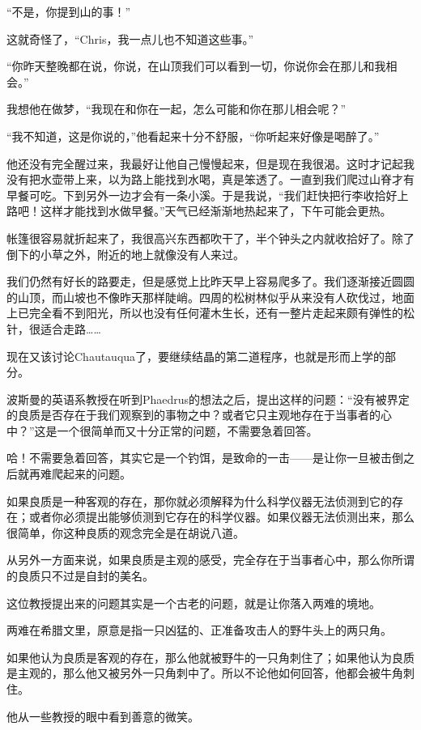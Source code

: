 \documentclass[UTF8]{article}
\begin{document}
\par “不是，你提到山的事！”
\par 这就奇怪了，“Chris，我一点儿也不知道这些事。”
\par “你昨天整晚都在说，你说，在山顶我们可以看到一切，你说你会在那儿和我相会。”
\par 我想他在做梦，“我现在和你在一起，怎么可能和你在那儿相会呢？”
\par “我不知道，这是你说的，”他看起来十分不舒服，“你听起来好像是喝醉了。”
\par 他还没有完全醒过来，我最好让他自己慢慢起来，但是现在我很渴。这时才记起我没有把水壶带上来，以为路上能找到水喝，真是笨透了。一直到我们爬过山脊才有早餐可吃。下到另外一边才会有一条小溪。于是我说，“我们赶快把行李收拾好上路吧！这样才能找到水做早餐。”天气已经渐渐地热起来了，下午可能会更热。
\par 帐篷很容易就折起来了，我很高兴东西都吹干了，半个钟头之内就收拾好了。除了倒下的小草之外，附近的地上就像没有人来过。
\par 我们仍然有好长的路要走，但是感觉上比昨天早上容易爬多了。我们逐渐接近圆圆的山顶，而山坡也不像昨天那样陡峭。四周的松树林似乎从来没有人砍伐过，地面上已完全看不到阳光，所以也没有任何灌木生长，还有一整片走起来颇有弹性的松针，很适合走路……
\par 现在又该讨论Chautauqua了，要继续结晶的第二道程序，也就是形而上学的部分。
\par 波斯曼的英语系教授在听到Phaedrus的想法之后，提出这样的问题：“没有被界定的良质是否存在于我们观察到的事物之中？或者它只主观地存在于当事者的心中？”这是一个很简单而又十分正常的问题，不需要急着回答。
\par 哈！不需要急着回答，其实它是一个钓饵，是致命的一击——是让你一旦被击倒之后就再难爬起来的问题。
\par 如果良质是一种客观的存在，那你就必须解释为什么科学仪器无法侦测到它的存在；或者你必须提出能够侦测到它存在的科学仪器。如果仪器无法侦测出来，那么很简单，你这种良质的观念完全是在胡说八道。
\par 从另外一方面来说，如果良质是主观的感受，完全存在于当事者心中，那么你所谓的良质只不过是自封的美名。
\par 这位教授提出来的问题其实是一个古老的问题，就是让你落入两难的境地。
\par 两难在希腊文里，原意是指一只凶猛的、正准备攻击人的野牛头上的两只角。
\par 如果他认为良质是客观的存在，那么他就被野牛的一只角刺住了；如果他认为良质是主观的，那么他又被另外一只角刺中了。所以不论他如何回答，他都会被牛角刺住。
\par 他从一些教授的眼中看到善意的微笑。
\end{document}
